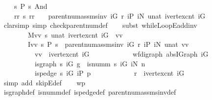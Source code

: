 \begin{isabellebody}
\ \ {\isasymlbrace}\ {\isacharparenleft}{\isasymlambda}{\isacharunderscore}\ s{\isachardot}\ P\ s{\isacharparenright}\ And\ \isanewline
\ \ \ \ {\isacharparenleft}{\isasymlambda}rr\ s{\isachardot}\ rr\ {\isasymnoteq}\ {}\ {\isasymlongleftrightarrow}\ parent{\isacharunderscore}num{\isacharunderscore}assms{\isacharunderscore}inv\ iG\ r\ iP\ iN\ {\isacharparenleft}unat\ {\isacharparenleft}ivertex{\isacharunderscore}cnt\ iG{\isacharparenright}{\isacharparenright}{\isacharparenright}\ {\isasymrbrace}{\isacharbang}{\isachardoublequoteclose}\isanewline
%
\isadelimproof
\ \ %
\endisadelimproof
%
\isatagproof
{}\isamarkupfalse%
\ {\isacharparenleft}clarsimp\ simp{\isacharcolon}\ check{\isacharunderscore}parent{\isacharunderscore}num{\isacharprime}{\isacharunderscore}def{\isacharparenright}\isanewline
\ \ \isamarkupfalse%
\ {\isacharparenleft}subst\ whileLoopE{\isacharunderscore}add{\isacharunderscore}inv{\isacharbrackleft}\isanewline
\ \ \ \ \ \ \ \ M{\isacharequal}{\isachardoublequoteopen}{\isasymlambda}{\isacharparenleft}vv{\isacharcomma}\ s{\isacharparenright}{\isachardot}\ unat\ {\isacharparenleft}ivertex{\isacharunderscore}cnt\ iG\ {\isacharminus}\ vv{\isacharparenright}{\isachardoublequoteclose}\ \isanewline
\ \ \ \ \ \ \ \ I{\isacharequal}{\isachardoublequoteopen}{\isasymlambda}vv\ s{\isachardot}\ P\ s\ {\isasymand}\ parent{\isacharunderscore}num{\isacharunderscore}assms{\isacharunderscore}inv\ iG\ r\ iP\ iN\ {\isacharparenleft}unat\ vv{\isacharparenright}\ {\isasymand}\ \isanewline
\ \ \ \ \ \ \ \ \ \ vv\ {\isasymle}\ ivertex{\isacharunderscore}cnt\ iG\ {\isasymand}\ \isanewline
\ \ \ \ \ \ \ \ \ \ wf{\isacharunderscore}digraph\ {\isacharparenleft}abs{\isacharunderscore}IGraph\ iG{\isacharparenright}\ {\isasymand}\ \isanewline
\ \ \ \ \ \ \ \ \ \ is{\isacharunderscore}graph\ s\ iG\ g\ {\isasymand}\ is{\isacharunderscore}numm\ s\ iG\ iN\ n\ {\isasymand}\ \isanewline
\ \ \ \ \ \ \ \ \ \ is{\isacharunderscore}pedge\ s\ iG\ iP\ p\ {\isasymand}\ \isanewline
\ \ \ \ \ \ \ \ \ \ r\ {\isacharless}\ ivertex{\isacharunderscore}cnt\ iG{\isachardoublequoteclose}{\isacharbrackright}{\isacharparenright}\isanewline
\ \ \isamarkupfalse%
\ {\isacharparenleft}simp\ add{\isacharcolon}\ skipE{\isacharunderscore}def{\isacharparenright}\isanewline
\ \ \isamarkupfalse%
\ wp\isanewline
\ \ \ \ \isamarkupfalse%
\ is{\isacharunderscore}graph{\isacharunderscore}def\ is{\isacharunderscore}numm{\isacharunderscore}def\ is{\isacharunderscore}pedge{\isacharunderscore}def\ parent{\isacharunderscore}num{\isacharunderscore}assms{\isacharunderscore}inv{\isacharunderscore}def\isanewline

\end{isabellebody}
